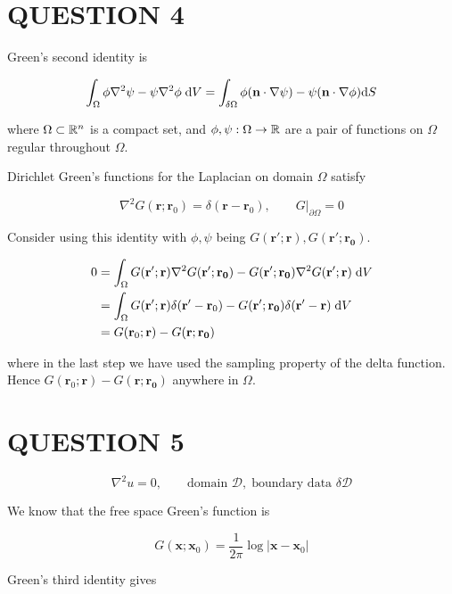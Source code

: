 \documentclass[a4paper]{article}
\begin{document}
\section{QUESTION 4}

Green's second identity is 

\[ \int_{\Omega}  \phi \nabla^{2} \psi  - \psi \nabla^{2} \phi \;  \mathrm{d} V = \int_{\delta \Omega} \phi ( \mathbf{n} \cdot \nabla \psi ) - \psi( \mathbf{n} \cdot \nabla \phi ) \mathrm{d} S   \]

where $ \Omega \subset \mathbb{R}^{n} $ is a compact set, and $ \phi, \psi : \Omega \to \mathbb{R} $ are a pair of functions on $ \Omega $ regular throughout $ \Omega $.

Dirichlet Green's functions for the Laplacian on domain $ \Omega $ satisfy 

\[ \nabla^{2} G(\mathbf{r};\mathbf{r}_{0}) = \delta(\mathbf{r} - \mathbf{r}_{0}), \qquad G |_{\partial \Omega} = 0 \]

Consider using this identity with $ \phi, \psi $ being $ G(\mathbf{r}'; \mathbf{r}), G(\mathbf{r}'; \mathbf{r_{0}})  $.

\begin{align*}
0 & = \int_{\Omega}  G(\mathbf{r}'; \mathbf{r}) \nabla^{2} G(\mathbf{r}'; \mathbf{r_{0}}) - G(\mathbf{r}'; \mathbf{r_{0}}) \nabla^{2} G(\mathbf{r}'; \mathbf{r}) \;  \mathrm{d} V \\
& = \int_{\Omega}  G(\mathbf{r}'; \mathbf{r}) \delta(\mathbf{r}' - \mathbf{r}_{0}) - G(\mathbf{r}'; \mathbf{r_{0}}) \delta(\mathbf{r}' - \mathbf{r}) \;  \mathrm{d} V \\
& = G(\mathbf{r}_{0}; \mathbf{r})  - G(\mathbf{r}; \mathbf{r_{0}})
\end{align*}

where in the last step we have used the sampling property of the delta function. Hence $ G(\mathbf{r}_{0}; \mathbf{r})  - G(\mathbf{r}; \mathbf{r_{0}}) $ anywhere in $ \Omega $.

\section{QUESTION 5}

\[ \nabla^{2} u = 0, \qquad \text{domain } \mathcal{D}, \; \text{boundary data } \delta \mathcal{D} \]

We know that the free space Green's function is

\[ G (\mathbf{x} ; \mathbf{x}_{0} ) = \frac{1}{2\pi} \log | \mathbf{x} - \mathbf{x}_{0} | \]


Green's third identity gives
\end{document}
